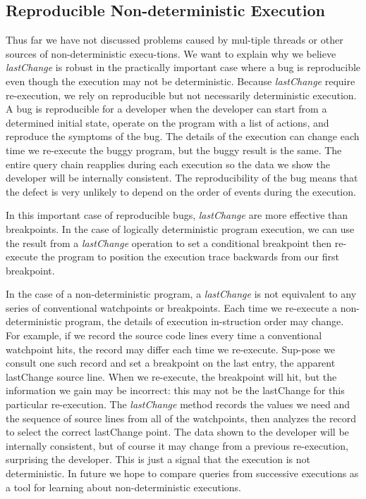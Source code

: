 \documentclass[preprint]{sigplanconf}
\begin{document}
\subsection{Reproducible Non-deterministic Execution}
Thus far we have not discussed problems caused by mul-tiple threads or
other sources of non-deterministic execu-tions. We want to explain why
we believe \textit{lastChange} is robust in the practically important
case where a bug is reproducible even though the execution may not be
deterministic.  Because \textit{lastChange} require re-execution, we
rely on reproducible but not necessarily deterministic execution. A
bug is reproducible for a developer when the developer can start from
a determined initial state, operate on the program with a list of
actions, and reproduce the symptoms of the bug. The details of the
execution can change each time we re-execute the buggy program, but
the buggy result is the same. The entire query chain reapplies during
each execution so the data we show the developer will be internally
consistent. The reproducibility of the bug means that the defect is
very unlikely to depend on the order of events during the execution.

In this important case of reproducible bugs, \textit{lastChange} are
more effective than breakpoints. In the case of logically
deterministic program execution, we can use the result from a
\textit{lastChange} operation to set a conditional breakpoint then
re-execute the program to position the execution trace backwards from
our first breakpoint.


In the case of a non-deterministic program, a \textit{lastChange} is
not equivalent to any series of conventional watchpoints or
breakpoints. Each time we re-execute a non-deterministic program, the
details of execution in-struction order may change. For example, if we
record the source code lines every time a conventional watchpoint
hits, the record may differ each time we re-execute. Sup-pose we
consult one such record and set a breakpoint on the last entry, the
apparent lastChange source line. When we re-execute, the breakpoint
will hit, but the information we gain may be incorrect: this may not
be the lastChange for this particular re-execution. The
\textit{lastChange} method records the values we need and the sequence
of source lines from all of the watchpoints, then analyzes the record
to select the correct lastChange point. The data shown to the
developer will be internally consistent, but of course it may change
from a previous re-execution, surprising the developer. This is just a
signal that the execution is not deterministic. In future we hope to
compare queries from successive executions as a tool for learning
about non-deterministic executions.
\end{document}
